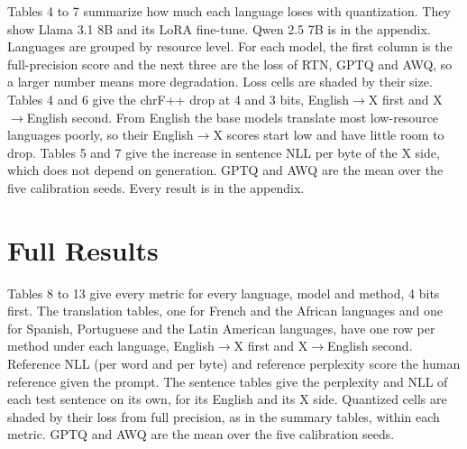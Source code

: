 \documentclass[11pt]{article}
\begin{document}
Tables 4 to 7 summarize how much each language loses with quantization. They show Llama 3.1 8B and its LoRA fine-tune. Qwen 2.5 7B is in the appendix. Languages are grouped by resource level. For each model, the first column is the full-precision score and the next three are the loss of RTN, GPTQ and AWQ, so a larger number means more degradation. Loss cells are shaded by their size. Tables 4 and 6 give the chrF++ drop at 4 and 3 bits, English$\rightarrow$X first and X$\rightarrow$English second. From English the base models translate most low-resource languages poorly, so their English$\rightarrow$X scores start low and have little room to drop. Tables 5 and 7 give the increase in sentence NLL per byte of the X side, which does not depend on generation. GPTQ and AWQ are the mean over the five calibration seeds. Every result is in the appendix.



\clearpage
\appendix
\section{Full Results}

Tables 8 to 13 give every metric for every language, model and method, 4 bits first. The translation tables, one for French and the African languages and one for Spanish, Portuguese and the Latin American languages, have one row per method under each language, English$\rightarrow$X first and X$\rightarrow$English second. Reference NLL (per word and per byte) and reference perplexity score the human reference given the prompt. The sentence tables give the perplexity and NLL of each test sentence on its own, for its English and its X side. Quantized cells are shaded by their loss from full precision, as in the summary tables, within each metric. GPTQ and AWQ are the mean over the five calibration seeds.



% 
% 
\end{document}

